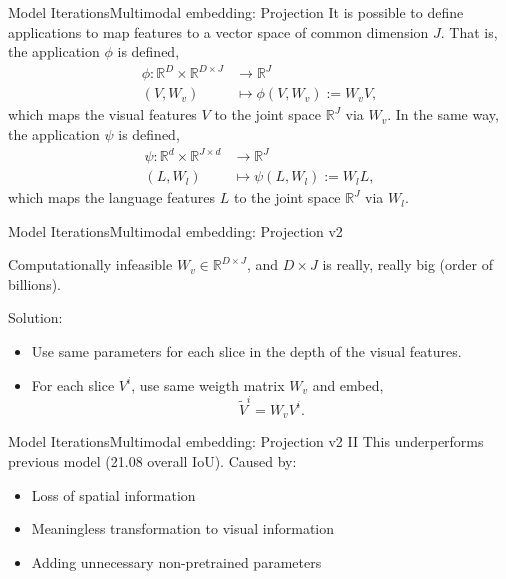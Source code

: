 \documentclass{beamer}
\newcommand{\R}{\mathbb{R}}
\begin{document}
\begin{frame}{Model Iterations}{Multimodal embedding: Projection}
  It is possible to define applications to map features to a vector space of
  common dimension \(J\). That is, the application \(\phi\) is defined,
  \begin{equation}
    \begin{aligned}
      \phi \colon \R^{D} \times \R^{D \times J} &\longrightarrow \R^J \\ (V, W_v)
      &\longmapsto \phi(V, W_v) := W_v V,
    \end{aligned}
  \end{equation}
  which maps the visual features \(V\) to the joint space \(\R^J\) via
  \(W_v\). In the same way, the application \(\psi\) is defined,
  \begin{equation}
    \begin{aligned}
      \psi \colon \R^{d} \times \R^{J \times d} &\longrightarrow \R^J \\ (L, W_l)
      &\longmapsto \psi(L, W_l) := W_l L,
    \end{aligned}
  \end{equation}
  which maps the language features \(L\) to the joint space \(\R^J\) via
  \(W_l\).
\end{frame}

\begin{frame}{Model Iterations}{Multimodal embedding: Projection v2}
  \begin{alertblock}{Computationally infeasible}
    \(W_v \in \R^{D \times J}\), and \(D \times J\) is really, really big
    (order of billions).
  \end{alertblock}
  Solution:
  \begin{itemize}
    \item Use same parameters for each slice in the depth of the visual
    features.
    \item For each slice \(V^i\), use same weigth matrix \(W_v\) and embed,
    \begin{equation}
      \tilde{V}^i = W_v V^i.
    \end{equation}
  \end{itemize}
\end{frame}

\begin{frame}{Model Iterations}{Multimodal embedding: Projection v2 II}
  This underperforms previous model (21.08 overall IoU). Caused by:
  \begin{itemize}
    \item Loss of spatial information
    \item Meaningless transformation to visual information
    \item Adding unnecessary non-pretrained parameters
  \end{itemize}
\end{frame}
\end{document}
